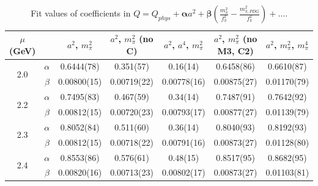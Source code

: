 \documentclass[12pt]{extarticle}
\begin{document}
\begin{table}[h!]
\begin{center}
\begin{tabular}{|c c|c|c|c|c|c|}
\hline
$\mu$ (GeV) &  & $a^2$, $m_\pi^2$& $a^2$, $m_\pi^2$ (no C)& $a^2$, $a^4$, $m_\pi^2$& $a^2$, $m_\pi^2$ (no M3, C2)& $a^2$, $m_\pi^2$, $m_\pi^4$\\
\hline
\multirow{2}{0.5in}{2.0} & $\alpha$ & 0.6444(78)& 0.351(57)& 0.16(14)& 0.6458(86)& 0.6610(87)\\
 & $\beta$ & 0.00800(15)& 0.00719(22)& 0.00778(16)& 0.00875(27)& 0.01170(79)\\
\hline
\multirow{2}{0.5in}{2.2} & $\alpha$ & 0.7495(83)& 0.467(59)& 0.34(14)& 0.7487(91)& 0.7642(92)\\
 & $\beta$ & 0.00812(15)& 0.00720(23)& 0.00793(17)& 0.00877(27)& 0.01139(79)\\
\hline
\multirow{2}{0.5in}{2.3} & $\alpha$ & 0.8052(84)& 0.511(60)& 0.36(14)& 0.8040(93)& 0.8192(93)\\
 & $\beta$ & 0.00812(15)& 0.00718(22)& 0.00791(16)& 0.00873(27)& 0.01128(80)\\
\hline
\multirow{2}{0.5in}{2.4} & $\alpha$ & 0.8553(86)& 0.576(61)& 0.48(15)& 0.8517(95)& 0.8682(95)\\
 & $\beta$ & 0.00820(16)& 0.00713(23)& 0.00802(17)& 0.00873(27)& 0.01103(81)\\
\hline
\end{tabular}
\caption{Fit values of coefficients in $Q = Q_{phys} + \mathbf{\alpha} a^2 + \mathbf{\beta}\left(\frac{m_\pi^2}{f_\pi^2}-\frac{m_{\pi,PDG}^2}{f_\pi^2}\right) + \ldots$.}
\end{center}
\end{table}




















\clearpage
\end{document}

